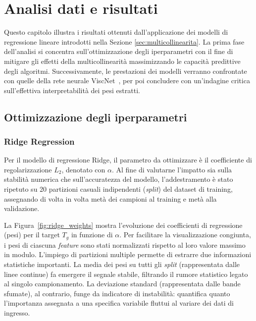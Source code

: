 \documentclass[../main.tex]{subfiles}
\begin{document}
	\chapter{Analisi dati e risultati}
	\label{sec:risultati}
	
	Questo capitolo illustra i risultati ottenuti dall'applicazione dei modelli di regressione lineare introdotti nella Sezione \ref{sec:multicollinearita}. La prima fase dell'analisi si concentra sull'ottimizzazione degli iperparametri con il fine di mitigare gli effetti della multicollinearità massimizzando le capacità predittive degli algoritmi. Successivamente, le prestazioni dei modelli verranno confrontate con quelle della rete neurale ViscNet~\cite{cassarViscNetNeuralNetwork2021}, per poi concludere con un'indagine critica sull'effettiva interpretabilità dei pesi estratti.
	
	\section{Ottimizzazione degli iperparametri}
	\label{sec:iperparametri}
	
	\subsection{Ridge Regression}
	
	Per il modello di regressione Ridge, il parametro da ottimizzare è il coefficiente di regolarizzazione $L_2$, denotato con $\alpha$. Al fine di valutarne l'impatto sia sulla stabilità numerica che sull'accuratezza del modello, l'addestramento è stato ripetuto su 20 partizioni casuali indipendenti (\textit{split}) del dataset di training, assegnando di volta in volta metà dei campioni al training e metà alla validazione.
	
	La Figura~\ref{fig:ridge_weights} mostra l'evoluzione dei coefficienti di regressione (pesi) per il target $T_g$ in funzione di $\alpha$. Per facilitare la visualizzazione congiunta, i pesi di ciascuna \textit{feature} sono stati normalizzati rispetto al loro valore massimo in modulo. 
	L'impiego di partizioni multiple permette di estrarre due informazioni statistiche importanti. La media dei pesi su tutti gli \textit{split} (rappresentata dalle linee continue) fa emergere il segnale stabile, filtrando il rumore statistico legato al singolo campionamento. La deviazione standard (rappresentata dalle bande sfumate), al contrario, funge da indicatore di instabilità: quantifica quanto l'importanza assegnata a una specifica variabile fluttui al variare dei dati di ingresso.
	
\end{document}
